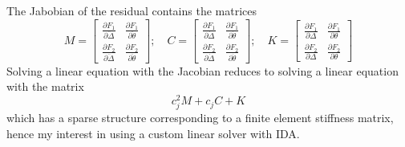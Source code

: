 \documentclass{article}
\begin{document}
The Jabobian of the residual contains the matrices
\begin{equation*}
    M = \begin{bmatrix} 
            \frac{\partial F_1}{\partial \ddot{\Delta}} &
            \frac{\partial F_1}{\partial \ddot{\theta}} \\[0.5em]
            \frac{\partial F_2}{\partial \ddot{\Delta}} &
            \frac{\partial F_2}{\partial \ddot{\theta}}
        \end{bmatrix}; \quad
    C = \begin{bmatrix} 
            \frac{\partial F_1}{\partial \dot{\Delta}} &
            \frac{\partial F_1}{\partial \dot{\theta}} \\[0.5em]
            \frac{\partial F_2}{\partial \dot{\Delta}} &
            \frac{\partial F_2}{\partial \dot{\theta}}
        \end{bmatrix}; \quad
    K = \begin{bmatrix} 
            \frac{\partial F_1}{\partial \Delta} &
            \frac{\partial F_1}{\partial \theta} \\[0.5em]
            \frac{\partial F_2}{\partial \Delta} &
            \frac{\partial F_2}{\partial \theta}
        \end{bmatrix}
\end{equation*}
Solving a linear equation with the Jacobian reduces to solving a linear equation 
with the matrix
\begin{equation*}
    c_j^2 M + c_j C + K
\end{equation*}
which has a sparse structure corresponding to a finite element stiffness matrix,
hence my interest in using a custom linear solver with IDA.
\end{document}
